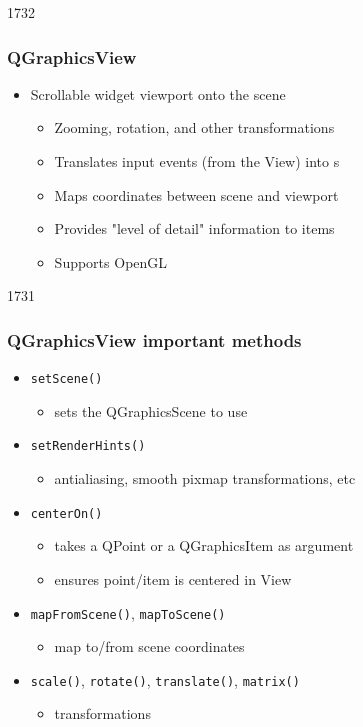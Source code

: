 \begin{slide}{1732}
\frametitle{QGraphicsView}
\begin{itemize}
\item Scrollable widget viewport onto the scene
    \begin{itemize}
    \item Zooming, rotation, and other transformations
    \item Translates input events (from the View) into s
    \item Maps coordinates between scene and viewport
    \item Provides "level of detail" information to items
    \item Supports OpenGL
    \end{itemize}
\end{itemize}
\end{slide}
\begin{slide}{1731}
\frametitle{QGraphicsView important methods}

\begin{itemize}
\item \texttt{setScene()}
    \begin{itemize}
    \item sets the QGraphicsScene to use
    \end{itemize}
\item \texttt{setRenderHints()}
    \begin{itemize}
    \item antialiasing, smooth pixmap transformations, etc
    \end{itemize}
\item \texttt{centerOn()}
    \begin{itemize}
    \item takes a QPoint or a QGraphicsItem as argument
    \item ensures point/item is centered in View
    \end{itemize}
\item \texttt{mapFromScene()}, \texttt{mapToScene()}
    \begin{itemize}
    \item map to/from scene coordinates
    \end{itemize}
\item \texttt{scale()}, \texttt{rotate()}, \texttt{translate()}, \texttt{matrix()}
    \begin{itemize}
    \item transformations
    \end{itemize}
\end{itemize}
\end{slide}


